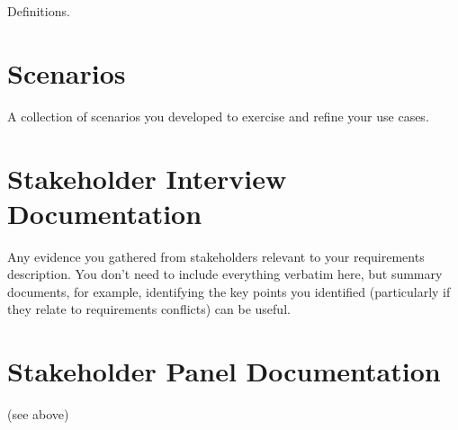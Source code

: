 \documentclass{l3deliverable}
\begin{document}
Definitions.

\section{Scenarios}

A collection of scenarios you developed to exercise and refine your
use cases.

\section{Stakeholder Interview Documentation}

Any evidence you gathered from stakeholders relevant to your
requirements description.  You don't need to include everything
verbatim here, but summary documents, for example, identifying the key
points you identified (particularly if they relate to requirements
conflicts) can be useful.

\section{Stakeholder Panel Documentation}

(see above)

\end{document}
